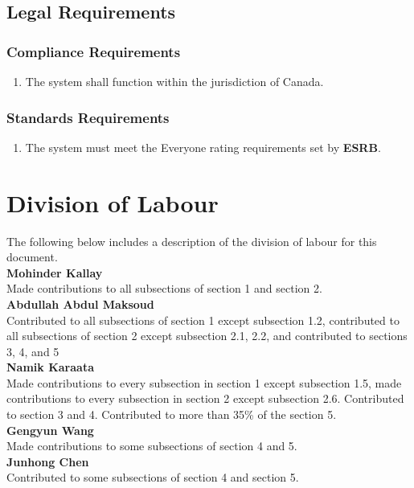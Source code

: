\documentclass[]{article}
\begin{document}

\subsection{Legal Requirements}
\label{sub:legal_requirements}

\subsubsection{Compliance Requirements}
\label{ssub:compliance_requirements}
\begin{enumerate}[{LR}1. ]
	\item The system shall function within the jurisdiction of Canada.
\end{enumerate}

\subsubsection{Standards Requirements}
\label{ssub:standards_requirements}
\begin{enumerate}[{LR}1. ]
	\item The system must meet the Everyone rating requirements set by \textbf{ESRB}.
\end{enumerate}



\appendix
\section{Division of Labour}
\label{sec:division_of_labour}
The following below includes a description of the division of labour for this document. \\

\noindent\textbf{Mohinder Kallay} \\
Made contributions to all subsections of section 1 and section 2. \\
\textbf{Abdullah Abdul Maksoud} \\ 
Contributed to all subsections of section 1 except subsection 1.2, contributed to all subsections of section 2 except subsection 2.1, 2.2, and contributed to sections 3, 4, and 5\\
\textbf{Namik Karaata} \\ 
Made contributions to every subsection in section 1 except subsection 1.5, made contributions to every subsection in section 2 except subsection 2.6. Contributed to section 3 and 4. Contributed to more than 35\% of the section 5.\\
\textbf{Gengyun Wang} \\
Made contributions to some subsections of section 4 and 5. \\
\textbf{Junhong Chen} \\
Contributed to some subsections of section 4 and section 5. \\
\end{document}

